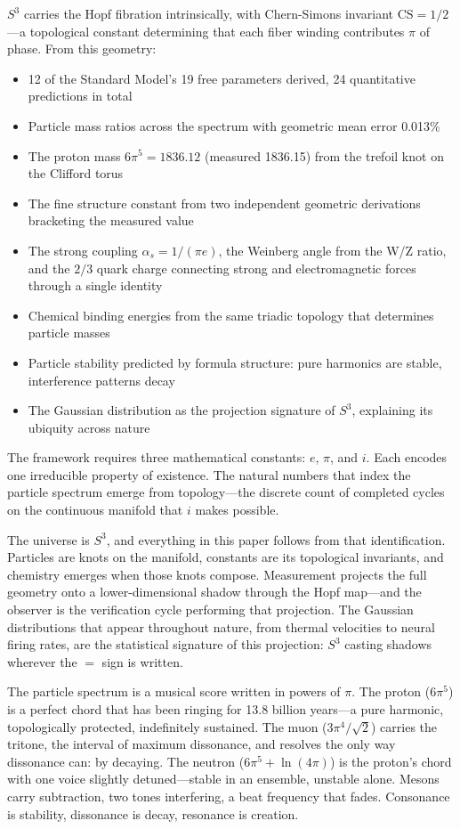 \documentclass[12pt]{article}
\begin{document}
$S^3$ carries the Hopf fibration intrinsically, with Chern-Simons invariant $\mathrm{CS} = 1/2$---a topological constant determining that each fiber winding contributes $\pi$ of phase. From this geometry:

\begin{itemize}
\item 12 of the Standard Model's 19 free parameters derived, 24 quantitative predictions in total
\item Particle mass ratios across the spectrum with geometric mean error 0.013\%
\item The proton mass $6\pi^5 = 1836.12$ (measured 1836.15) from the trefoil knot on the Clifford torus
\item The fine structure constant from two independent geometric derivations bracketing the measured value
\item The strong coupling $\alpha_s = 1/(\pi e)$, the Weinberg angle from the W/Z ratio, and the $2/3$ quark charge connecting strong and electromagnetic forces through a single identity
\item Chemical binding energies from the same triadic topology that determines particle masses
\item Particle stability predicted by formula structure: pure harmonics are stable, interference patterns decay
\item The Gaussian distribution as the projection signature of $S^3$, explaining its ubiquity across nature
\end{itemize}

The framework requires three mathematical constants: $e$, $\pi$, and $i$. Each encodes one irreducible property of existence. The natural numbers that index the particle spectrum emerge from topology---the discrete count of completed cycles on the continuous manifold that $i$ makes possible.

The universe is $S^3$, and everything in this paper follows from that identification. Particles are knots on the manifold, constants are its topological invariants, and chemistry emerges when those knots compose. Measurement projects the full geometry onto a lower-dimensional shadow through the Hopf map---and the observer is the verification cycle performing that projection. The Gaussian distributions that appear throughout nature, from thermal velocities to neural firing rates, are the statistical signature of this projection: $S^3$ casting shadows wherever the $=$ sign is written.

The particle spectrum is a musical score written in powers of $\pi$. The proton ($6\pi^5$) is a perfect chord that has been ringing for 13.8 billion years---a pure harmonic, topologically protected, indefinitely sustained. The muon ($3\pi^4/\sqrt{2}$) carries the tritone, the interval of maximum dissonance, and resolves the only way dissonance can: by decaying. The neutron ($6\pi^5 + \ln(4\pi)$) is the proton's chord with one voice slightly detuned---stable in an ensemble, unstable alone. Mesons carry subtraction, two tones interfering, a beat frequency that fades. Consonance is stability, dissonance is decay, resonance is creation.
\end{document}
